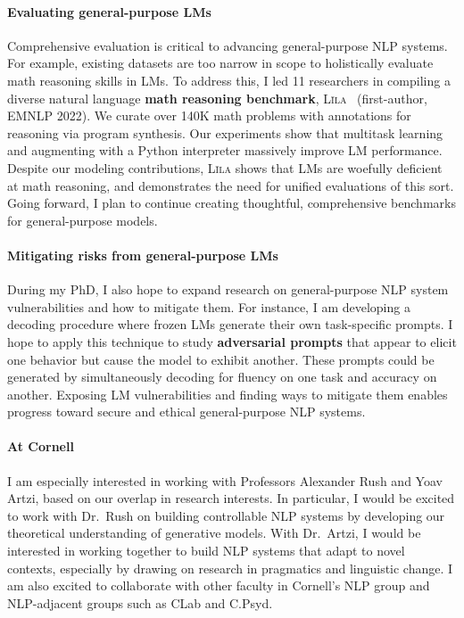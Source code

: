 \documentclass[11pt]{article}
\newcommand\lila{\textsc{L\={\i}la}\xspace}
\newcommand\inst{Cornell\xspace}
\begin{document}
\paragraph{Evaluating general-purpose LMs}

Comprehensive evaluation is critical to advancing general-purpose NLP systems.
For example, existing datasets are too narrow in scope 
to holistically evaluate math reasoning skills in LMs.
To address this, I led 11 researchers 
in compiling a diverse natural language 
\textbf{math reasoning benchmark}, 
\lila~\cite{Mishra2022LilaAU} (first-author, EMNLP 2022).
We curate over 140K math problems
with annotations for reasoning via program synthesis. 
Our experiments show that multitask learning 
and augmenting with a Python interpreter
massively improve LM performance. 
Despite our modeling contributions, \lila shows that LMs 
are woefully deficient at math reasoning,
and demonstrates the need for unified evaluations of this sort.
Going forward, I plan to continue creating thoughtful, comprehensive benchmarks 
for general-purpose models.

\paragraph{Mitigating risks from general-purpose LMs} 

During my PhD, I also hope to expand research 
on general-purpose NLP system vulnerabilities and how to mitigate them.
For instance, I am developing a decoding procedure where frozen LMs 
generate their own task-specific prompts.
I hope to apply this technique
to study \textbf{adversarial prompts}
that appear to elicit one behavior 
but cause the model to exhibit another.
These prompts could be generated by simultaneously 
decoding for fluency on one task and accuracy on another.
Exposing LM vulnerabilities and finding ways to mitigate them
enables progress 
toward secure and ethical general-purpose NLP systems. 

\paragraph{At \inst} 

I am especially interested in working 
with Professors Alexander Rush and Yoav Artzi,
based on our overlap in research interests. 
In particular, I would be excited to work with Dr.\ Rush 
on building controllable NLP systems 
by developing our theoretical understanding of generative models. 
With Dr.\ Artzi, I would be interested in working together 
to build NLP systems that adapt to novel contexts, 
especially by drawing on research in pragmatics and linguistic change. 
I am also excited to collaborate with other faculty in Cornell's NLP group
and NLP-adjacent groups such as CLab and C.Psyd.



\end{document}
